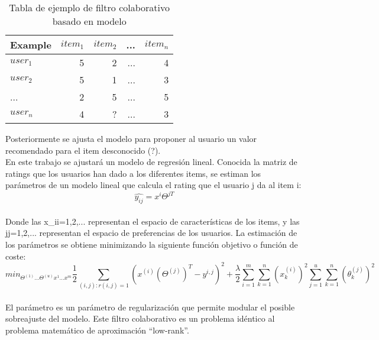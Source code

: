 \begin{table}[]
\centering
\caption{Tabla de ejemplo de filtro colaborativo basado en modelo}
\label{tab:1}
\begin{tabular}{ lrrrr }
\toprule
Example                & $item_{1}$ & $item_{2}$ & ... & $item_{n}$ \\ \midrule
$user_{1}$ & 5         & 2           & ...           & 4       \\ 
$user_{2}$ & 5         & 1            & ...           & 3       \\ 
... & 2        & 5           & ...           & 5       \\ 
$user_{n}$ & 4         & ?           & ...          & 3       \\ \bottomrule
\end{tabular}
\end{table}

Posteriormente se ajusta el modelo para proponer al usuario un valor recomendado para el item desconocido (?).
\\En este trabajo se ajustará un modelo de regresión lineal. Conocida la matriz de ratings que los usuarios han dado a los diferentes items, se estiman los parámetros de un modelo lineal que calcula el rating que el usuario j da al item i:\begin{equation}
\widehat{y_{ij}} = x^{i}\Theta ^{jT}
\end{equation}\\Donde las {x\_{i}}i=1,2,... representan el espacio de características de los items, y las {j}j=1,2,... representan el espacio de preferencias de los usuarios. La estimación de los parámetros se obtiene minimizando la siguiente función objetivo o función de coste:\\
\begin{equation}
min_{\Theta ^{(1)}...\Theta ^{(u)} x^{1}...x^{m}} \frac{1}{2}\sum_{(i,j):r(i,j)=1}^{ }(x^{(i)}(\Theta ^{(j)})^{T}-y^{i,j})^{2}+\frac{\lambda }{2}\sum_{i=1}^{m}\sum_{k=1}^{n}(x_{k}^{(i)})^{2}\sum_{j=1}^{u}\sum_{k=1}^{n}(\theta _{k}^{(j)})^{2}
\end{equation}
\\El parámetro  es un parámetro de regularización que permite modular el posible sobreajuste del modelo.  Este filtro colaborativo es un problema idéntico al problema matemático de aproximación “low-rank”.
\\  

